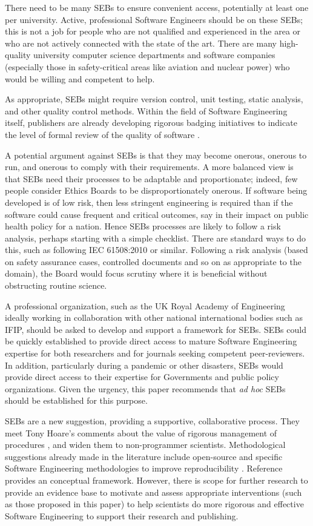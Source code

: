 \documentclass{comjnl}
\begin{document}
There need to be many SEBs to ensure convenient access, potentially at least one per university. Active, professional Software Engineers should be on these SEBs; this is not a job for people who are not qualified and experienced in the area or who are not actively connected with the state of the art. There are many high-quality university computer science departments and software companies (especially those in safety-critical areas like aviation and nuclear power) who would be willing and competent to help.

As appropriate, SEBs might require version control, unit testing, static analysis, and other quality control methods. Within the field of Software Engineering itself, publishers are already developing rigorous badging initiatives to indicate the level of formal review of the quality of software \cite{acm-artifacts}.

A potential argument against SEBs is that they may become onerous, onerous to run, and onerous to comply with their requirements. A more balanced view is that SEBs need their processes to be adaptable and proportionate; indeed, few people consider Ethics Boards to be disproportionately onerous. If software being developed is of low risk, then less stringent engineering is required than if the software could cause frequent and critical outcomes, say in their impact on public health policy for a nation. Hence SEBs processes are likely to follow a risk analysis, perhaps starting with a simple checklist. There are standard ways to do this, such as following IEC 61508:2010 \cite{redmill,iec61508} or similar. Following a risk analysis (based on safety assurance cases, controlled documents and so on as appropriate to the domain), the Board would focus scrutiny where it is beneficial without obstructing routine science.

A professional organization, such as the UK Royal Academy of Engineering ideally working in collaboration with other national international bodies such as IFIP, should be asked to develop and support a framework for SEBs. SEBs could be quickly established to provide direct access to mature Software Engineering expertise for both researchers and for journals seeking competent peer-reviewers. In addition, particularly during a pandemic or other disasters, SEBs would provide direct access to their expertise for Governments and public policy organizations. Given the urgency, this paper recommends that \emph{ad hoc\/} SEBs should be established for this purpose.

SEBs are a new suggestion, providing a supportive, collaborative process. They meet Tony Hoare's comments about the value of rigorous management of procedures \cite{hoare-unreasonable}, and widen them to non-programmer scientists. Methodological suggestions already made in the literature include open-source and specific Software Engineering methodologies to improve reproducibility \cite{basic-reproducibilty,open-source}. Reference \cite{ABCs-SE} provides an conceptual framework. However, there is scope for further research to provide an evidence base to motivate and assess appropriate interventions (such as those proposed in this paper) to help scientists do more rigorous and effective Software Engineering to support their research and publishing. 
\end{document}
